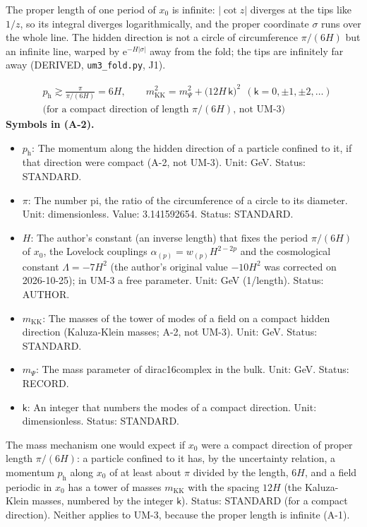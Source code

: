 \documentclass[
  10pt,
]{article}
\providecommand{\tightlist}{%
  \setlength{\itemsep}{0pt}\setlength{\parskip}{0pt}}
\begin{document}
The proper length of one period of \(x_0\) is infinite:
\(\lvert\cot z\rvert\) diverges at the tips like \(1/z\), so its
integral diverges logarithmically, and the proper coordinate \(\sigma\)
runs over the whole line. The hidden direction is not a circle of
circumference \(\pi/(6H)\) but an infinite line, warped by
\(\mathrm{e}^{-H\lvert\sigma\rvert}\) away from the fold; the tips are
infinitely far away (DERIVED, \texttt{um3\_fold.py}, J1).

\[
\begin{aligned}
&p_{\mathrm{h}} \gtrsim \frac{\pi}{\pi/(6H)} = 6H,\qquad m_{\mathrm{KK}}^2 = m_\Psi^2 + \big(12H\,\mathsf{k}\big)^2\ \ (\mathsf{k} = 0, \pm1, \pm2, \dots)\\
&\text{(for a compact direction of length } \pi/(6H)\text{, not UM-3)}
\end{aligned} \tag{A-2}
\] \textbf{Symbols in (A-2).}

\begin{itemize}
\tightlist
\item
  \(p_{\mathrm{h}}\): The momentum along the hidden direction of a
  particle confined to it, if that direction were compact (A-2, not
  UM-3). Unit: GeV. Status: STANDARD.
\item
  \(\pi\): The number pi, the ratio of the circumference of a circle to
  its diameter. Unit: dimensionless. Value: 3.141592654. Status:
  STANDARD.
\item
  \(H\): The author's constant (an inverse length) that fixes the period
  \(\pi/(6H)\) of \(x_0\), the Lovelock couplings
  \(\alpha_{(p)} = w_{(p)}H^{2-2p}\) and the cosmological constant
  \(\Lambda = -7H^2\) (the author's original value \(-10H^2\) was
  corrected on 2026-10-25); in UM-3 a free parameter. Unit: GeV
  (1/length). Status: AUTHOR.
\item
  \(m_{\mathrm{KK}}\): The masses of the tower of modes of a field on a
  compact hidden direction (Kaluza-Klein masses; A-2, not UM-3). Unit:
  GeV. Status: STANDARD.
\item
  \(m_\Psi\): The mass parameter of dirac16complex in the bulk. Unit:
  GeV. Status: RECORD.
\item
  \(\mathsf{k}\): An integer that numbers the modes of a compact
  direction. Unit: dimensionless. Status: STANDARD.
\end{itemize}

The mass mechanism one would expect if \(x_0\) were a compact direction
of proper length \(\pi/(6H)\): a particle confined to it has, by the
uncertainty relation, a momentum \(p_{\mathrm{h}}\) along \(x_0\) of at
least about \(\pi\) divided by the length, \(6H\), and a field periodic
in \(x_0\) has a tower of masses \(m_{\mathrm{KK}}\) with the spacing
\(12H\) (the Kaluza-Klein masses, numbered by the integer
\(\mathsf{k}\)). Status: STANDARD (for a compact direction). Neither
applies to UM-3, because the proper length is infinite (A-1).
\end{document}
